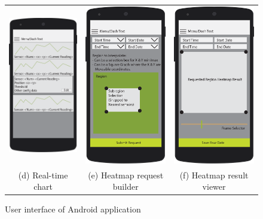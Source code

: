 \documentclass{article}
\begin{document}
\begin{figure}[!htbp]
\begin{center}
\begin{tabular}{c c c}
\includegraphics[width=0.25\linewidth]{Images/bare-nexus-5-mockup-screen-individual_data.png}&
\includegraphics[width=0.25\linewidth]{Images/bare-nexus-5-mockup-screen-heat-map-request.png}&
\includegraphics[width=0.25\linewidth]{Images/bare-nexus-5-mockup-screen-heat-map-result.png}\\
(d) Real-time chart & (e) Heatmap request builder & (f) Heatmap result viewer

\end{tabular}
\end{center}
\vspace{-0.15in}
\caption{\label{fig:app-ui}User interface of Android application}
\end{figure}
 
\end{document}
